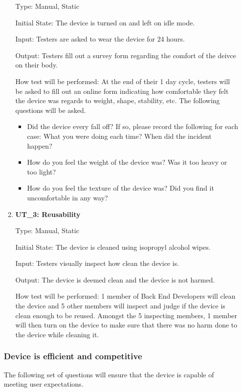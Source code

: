 \documentclass[12pt, titlepage]{article}
\begin{document}
\begin{enumerate}
\begin{enumerate}
Type: Manual, Static
					
Initial State: The device is turned on and left on idle mode.
					
Input: Testers are asked to wear the device for 24 hours.
					
Output: Testers fill out a survey form regarding the comfort of the deivce on their body.
					
How test will be performed: At the end of their 1 day cycle, testers will be asked to fill out an online form indicating how comfortable they felt the device was regards to weight, shape, stability, etc. The following questions will be asked.

\begin{itemize}
\item Did the device every fall off? If so, please record the following for each case: What you were doing each time? When did the incident happen?
\item How do you feel the weight of the device was? Was it too heavy or too light?
\item How do you feel the texture of the device was? Did you find it uncomfortable in any way?
\end{itemize}

\item\textbf{{UT\_3: Reusability\\}}

Type: Manual, Static
					
Initial State: The device is cleaned using isopropyl alcohol wipes.
					
Input: Testers visually inspect how clean the device is.
					
Output: The device is deemed clean and the device is not harmed.
					
How test will be performed: 1 member of Back End Developers will clean the device and 5 other members will inspect and judge if the device is clean enough to be reused. Amongst the 5 inspecting members, 1 member will then turn on the device to make sure that there was no harm done to the device while cleaning it.

\end{enumerate}



\subsubsection{Device is efficient and competitive}
The following set of questions will ensure that the device is capable of meeting user expectations.


\end{enumerate}
\end{document}
